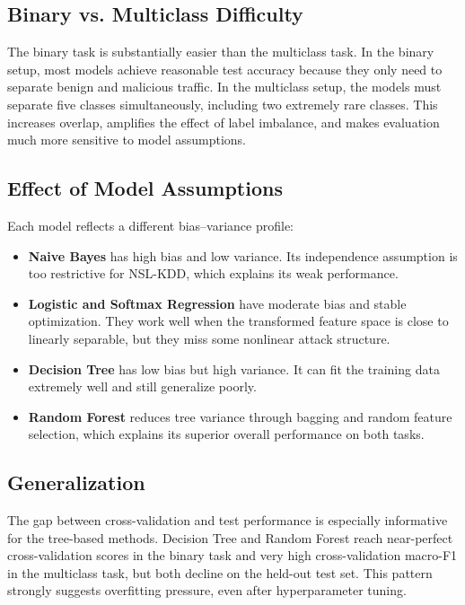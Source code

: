 \documentclass[12pt,a4paper]{article}
\begin{document}
\subsection{Binary vs. Multiclass Difficulty}

The binary task is substantially easier than the multiclass task. In the binary setup, most models achieve reasonable test accuracy because they only need to separate benign and malicious traffic. In the multiclass setup, the models must separate five classes simultaneously, including two extremely rare classes. This increases overlap, amplifies the effect of label imbalance, and makes evaluation much more sensitive to model assumptions.

\subsection{Effect of Model Assumptions}

Each model reflects a different bias--variance profile:
\begin{itemize}
    \item \textbf{Naive Bayes} has high bias and low variance. Its independence assumption is too restrictive for NSL-KDD, which explains its weak performance.
    \item \textbf{Logistic and Softmax Regression} have moderate bias and stable optimization. They work well when the transformed feature space is close to linearly separable, but they miss some nonlinear attack structure.
    \item \textbf{Decision Tree} has low bias but high variance. It can fit the training data extremely well and still generalize poorly.
    \item \textbf{Random Forest} reduces tree variance through bagging and random feature selection, which explains its superior overall performance on both tasks.
\end{itemize}

\subsection{Generalization}

The gap between cross-validation and test performance is especially informative for the tree-based methods. Decision Tree and Random Forest reach near-perfect cross-validation scores in the binary task and very high cross-validation macro-F1 in the multiclass task, but both decline on the held-out test set. This pattern strongly suggests overfitting pressure, even after hyperparameter tuning.
\end{document}
